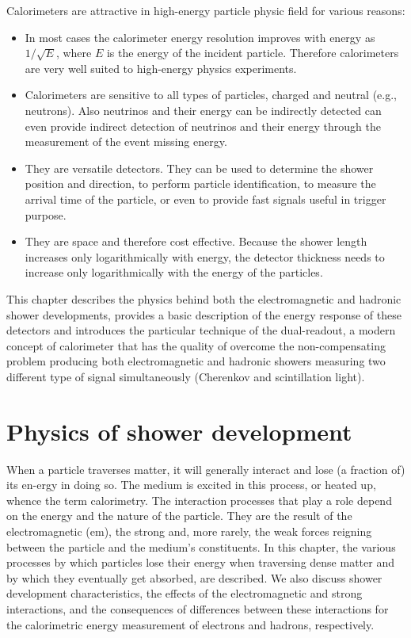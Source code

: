 Calorimeters are attractive in high-energy particle physic field for various reasons:
\begin{itemize}
		\item In most cases the calorimeter energy resolution improves with energy as $1/\sqrt{E}$, where $E$ is the energy of the incident particle. Therefore calorimeters are very well suited to high-energy physics experiments.
		\item Calorimeters are sensitive to all types of particles, charged and neutral (e.g., neutrons). Also neutrinos and their energy can be indirectly detected can even provide indirect detection of neutrinos and their energy through the measurement of the event missing energy.
		\item They are versatile detectors. They can be used to determine the shower position and direction, to perform particle identification, to measure the arrival time of the particle, or even to provide fast signals useful in trigger purpose.
		\item They are space and therefore cost effective. Because the shower length increases only logarithmically with energy, the detector thickness needs to increase only logarithmically with the energy of the particles.
\end{itemize}

This chapter describes the physics behind both the electromagnetic and hadronic shower developments, provides a basic description of the energy response of these detectors and introduces the particular technique of the dual-readout, a modern concept of calorimeter that has the quality of overcome the non-compensating problem producing both electromagnetic and hadronic showers measuring two different type of signal simultaneously (Cherenkov and scintillation light).\\

\section{Physics of shower development}
When a particle traverses matter, it will generally interact and lose (a fraction of) its en-ergy in doing so. The medium is excited in this process, or heated up, whence the term calorimetry.
The interaction processes that play a role depend on the energy and the nature of the particle.
They are the result of the electromagnetic (em), the strong and, more rarely, the weak forces reigning between the particle and the medium’s constituents.
In this chapter, the various processes by which particles lose their energy when traversing dense matter and by which they eventually get absorbed, are described.
We also discuss shower development characteristics, the effects of the electromagnetic and strong interactions, and the consequences of differences between these interactions for the calorimetric energy measurement of electrons and hadrons, respectively.

